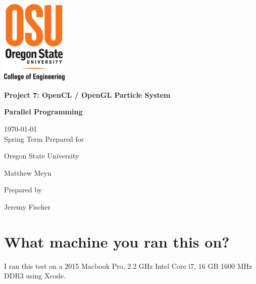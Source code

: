 \documentclass[onecolumn,draftclsnofoot, 10pt, compsoc]{IEEEtran}
\def \Jeremy{			Jeremy Fischer}
\def \Class{		Parallel Programming}
\def \Assn{		Project 7: OpenCL / OpenGL Particle System}
\def \School{	Oregon State University}
\def \Professor{		Matthew Meyn}
\begin{document}
\begin{titlepage}
    \begin{singlespace}
    	\includegraphics[height=4cm]{coe.eps}
        \hfill  
        \par\vspace{.2in}
        \centering
        \scshape{
            \vspace{.5in}
            \textbf{\Large\Assn}\par
            \textbf{\large\Class}\par
            \large{
            	\today \\Spring Term
        	}
            \vfill
            {\large Prepared for}\par
            \huge \School\par
            \vspace{5pt}
            {\Large{\Professor}\par}
            {\large Prepared by }\par

            \vspace{5pt}
            {\Large
                {\Jeremy}\par
            }
            \vspace{20pt}
        }

    \end{singlespace}
\end{titlepage}
\newpage
{}

\clearpage



\section{What machine you ran this on?}
	I ran this test on a 2015 Macbook Pro, 2.2 GHz Intel Core i7, 16 GB 1600 MHz DDR3 using Xcode.

		
\end{document}
